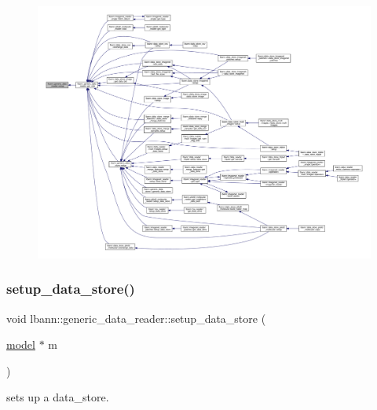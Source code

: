 \begin{figure}[H]
\begin{center}
\leavevmode
\includegraphics[width=350pt]{classlbann_1_1generic__data__reader_a879bb7dcb57a0aa1ef9c5039f5b0efda_icgraph}
\end{center}
\end{figure}
\mbox{\label{classlbann_1_1generic__data__reader_a8b2a09d38512fc11f1b9d572c89100a7}} 
\subsubsection{\texorpdfstring{setup\+\_\+data\+\_\+store()}{setup\_data\_store()}}
{\footnotesize\ttfamily void lbann\+::generic\+\_\+data\+\_\+reader\+::setup\+\_\+data\+\_\+store (\begin{DoxyParamCaption}\item[{\hyperlink{classlbann_1_1model}{model} $\ast$}]{m }\end{DoxyParamCaption})\hspace{0.3cm}{\ttfamily [virtual]}}



sets up a data\+\_\+store. 



